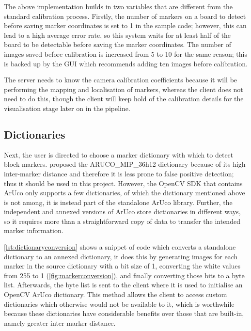 The above implementation builds in two variables that are different from the standard calibration process. Firstly, the number of markers on a board to detect before saving marker coordinates is set to 1 in the \citet{aruco} sample code; however, this can lead to a high average error rate, so this system waits for at least half of the board to be detectable before saving the marker coordinates. The number of images saved before calibration is increased from 5 to 10 for the same reason; this is backed up by the \citet{ucoslam} GUI which recommends adding ten images before calibration.

The server needs to know the camera calibration coefficients because it will be performing the mapping and localisation of markers, whereas the client does not need to do this, though the client will keep hold of the calibration details for the visualisation stage later on in the pipeline.

\subsection{Dictionaries}

Next, the user is directed to choose a marker dictionary with which to detect block markers. \citet{arucopaper} proposed the ARUCO\_MIP\_36h12 dictionary because of its high inter-marker distance and therefore it is less prone to false positive detection; thus it should be used in this project. However, the OpenCV SDK that contains ArUco only supports a few dictionaries, of which the dictionary mentioned above is not among, it is instead part of the standalone ArUco library. Further, the independent and annexed versions of ArUco store dictionaries in different ways, so it requires more than a straightforward copy of data to transfer the intended marker information.



\cref{lst:dictionaryconversion} shows a snippet of code which converts a standalone dictionary to an annexed dictionary, it does this by generating images for each marker in the source dictionary with a bit size of 1, converting the white values from 255 to 1 (\cref{fig:markerconversion}), and finally converting those bits to a byte list. Afterwards, the byte list is sent to the client where it is used to initialise an OpenCV ArUco dictionary. This method allows the client to access custom dictionaries which otherwise would not be available to it, which is worthwhile because these dictionaries have considerable benefits over those that are built-in, namely greater inter-marker distance.

